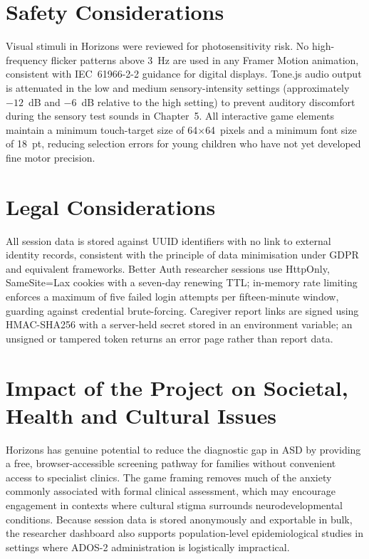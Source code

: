 \documentclass[12pt,a4paper,oneside]{report}
\begin{document}
\section{Safety Considerations}

Visual stimuli in Horizons were reviewed for photosensitivity risk. No high-frequency flicker patterns above 3~Hz are used in any Framer Motion animation, consistent with IEC~61966-2-2 guidance for digital displays. Tone.js audio output is attenuated in the low and medium sensory-intensity settings (approximately $-12$~dB and $-6$~dB relative to the high setting) to prevent auditory discomfort during the sensory test sounds in Chapter~5. All interactive game elements maintain a minimum touch-target size of 64$\times$64~pixels and a minimum font size of 18~pt, reducing selection errors for young children who have not yet developed fine motor precision.

\section{Legal Considerations}

All session data is stored against UUID identifiers with no link to external identity records, consistent with the principle of data minimisation under GDPR and equivalent frameworks. Better Auth researcher sessions use HttpOnly, SameSite=Lax cookies with a seven-day renewing TTL; in-memory rate limiting enforces a maximum of five failed login attempts per fifteen-minute window, guarding against credential brute-forcing. Caregiver report links are signed using HMAC-SHA256 with a server-held secret stored in an environment variable; an unsigned or tampered token returns an error page rather than report data.

\section{Impact of the Project on Societal, Health and Cultural Issues}

Horizons has genuine potential to reduce the diagnostic gap in ASD by providing a free, browser-accessible screening pathway for families without convenient access to specialist clinics. The game framing removes much of the anxiety commonly associated with formal clinical assessment, which may encourage engagement in contexts where cultural stigma surrounds neurodevelopmental conditions. Because session data is stored anonymously and exportable in bulk, the researcher dashboard also supports population-level epidemiological studies in settings where ADOS-2 administration is logistically impractical.
\end{document}
